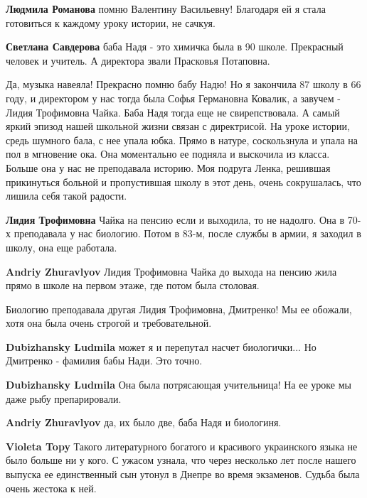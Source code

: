 \begin{itemize}
\begin{itemize}
\textbf{Людмила Романова} помню Валентину Васильевну! Благодаря ей я стала готовиться к каждому уроку истории, не сачкуя.

\textbf{Светлана Савдерова} баба Надя - это химичка была в 90 школе. Прекрасный человек и учитель. А директора звали Прасковья Потаповна.
\end{itemize} %


Да, музыка навеяла! Прекрасно помню бабу Надю! Но я закончила 87 школу в 66
году, и директором у нас тогда была Софья Германовна Ковалик, а завучем - Лидия
Трофимовна Чайка. Баба Надя тогда еще не свирепствовала. А самый яркий эпизод
нашей школьной жизни связан с директрисой. На уроке истории, средь шумного
бала, с нее упала юбка. Прямо в натуре, соскользнула и упала на пол в мгновение
ока. Она моментально ее подняла и выскочила из класса. Больше она у нас не
преподавала историю. Моя подруга Ленка, решившая прикинуться больной и
пропустившая школу в этот день, очень сокрушалась, что лишила себя такой
радости.

\begin{itemize} %
\textbf{Лидия Трофимовна} Чайка на пенсию если и выходила, то не надолго. Она в 70-х преподавала у нас биологию. Потом в 83-м, после службы в армии, я заходил в школу, она еще работала.

\textbf{Andriy Zhuravlyov} Лидия Трофимовна Чайка до выхода на пенсию жила прямо в школе на первом этаже, где потом была столовая.

Биологию преподавала другая Лидия Трофимовна, Дмитренко! Мы ее обожали, хотя она была очень строгой и требовательной.

\begin{itemize} %
\textbf{Dubizhansky Ludmila} может я и перепутал насчет биологички... Но Дмитренко - фамилия бабы Нади. Это точно.

\textbf{Dubizhansky Ludmila} Она была потрясающая учительница! На ее уроке мы даже рыбу препарировали.

\textbf{Andriy Zhuravlyov} да, их было две, баба Надя и биологиня.

\textbf{Violeta Topy} Такого литературного богатого и красивого украинского языка не было больше ни у кого. С ужасом узнала, что через несколько лет после нашего выпуска ее единственный сын утонул в Днепре во время экзаменов. Судьба была очень жестока к ней.
\end{itemize} %


\end{itemize}
\end{itemize}
